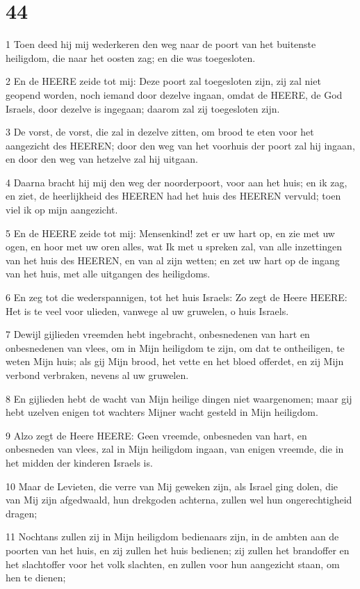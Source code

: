 \chapter{44}

\par 1 Toen deed hij mij wederkeren den weg naar de poort van het buitenste heiligdom, die naar het oosten zag; en die was toegesloten.
\par 2 En de HEERE zeide tot mij: Deze poort zal toegesloten zijn, zij zal niet geopend worden, noch iemand door dezelve ingaan, omdat de HEERE, de God Israels, door dezelve is ingegaan; daarom zal zij toegesloten zijn.
\par 3 De vorst, de vorst, die zal in dezelve zitten, om brood te eten voor het aangezicht des HEEREN; door den weg van het voorhuis der poort zal hij ingaan, en door den weg van hetzelve zal hij uitgaan.
\par 4 Daarna bracht hij mij den weg der noorderpoort, voor aan het huis; en ik zag, en ziet, de heerlijkheid des HEEREN had het huis des HEEREN vervuld; toen viel ik op mijn aangezicht.
\par 5 En de HEERE zeide tot mij: Mensenkind! zet er uw hart op, en zie met uw ogen, en hoor met uw oren alles, wat Ik met u spreken zal, van alle inzettingen van het huis des HEEREN, en van al zijn wetten; en zet uw hart op de ingang van het huis, met alle uitgangen des heiligdoms.
\par 6 En zeg tot die wederspannigen, tot het huis Israels: Zo zegt de Heere HEERE: Het is te veel voor ulieden, vanwege al uw gruwelen, o huis Israels.
\par 7 Dewijl gijlieden vreemden hebt ingebracht, onbesnedenen van hart en onbesnedenen van vlees, om in Mijn heiligdom te zijn, om dat te ontheiligen, te weten Mijn huis; als gij Mijn brood, het vette en het bloed offerdet, en zij Mijn verbond verbraken, nevens al uw gruwelen.
\par 8 En gijlieden hebt de wacht van Mijn heilige dingen niet waargenomen; maar gij hebt uzelven enigen tot wachters Mijner wacht gesteld in Mijn heiligdom.
\par 9 Alzo zegt de Heere HEERE: Geen vreemde, onbesneden van hart, en onbesneden van vlees, zal in Mijn heiligdom ingaan, van enigen vreemde, die in het midden der kinderen Israels is.
\par 10 Maar de Levieten, die verre van Mij geweken zijn, als Israel ging dolen, die van Mij zijn afgedwaald, hun drekgoden achterna, zullen wel hun ongerechtigheid dragen;
\par 11 Nochtans zullen zij in Mijn heiligdom bedienaars zijn, in de ambten aan de poorten van het huis, en zij zullen het huis bedienen; zij zullen het brandoffer en het slachtoffer voor het volk slachten, en zullen voor hun aangezicht staan, om hen te dienen;
